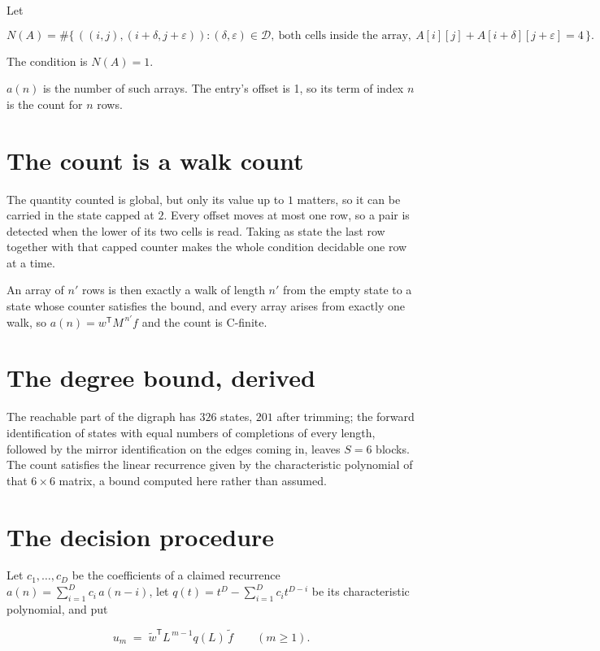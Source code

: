 \documentclass[11pt]{article}
\theoremstyle{definition}
\begin{document}
Let

\[N(A) = \#\bigl\{\,((i,j),(i{+}\delta,j{+}\varepsilon)) : (\delta,\varepsilon) \in \mathcal{D},\ \text{both cells inside the array},\ A[i][j] + A[i{+}\delta][j{+}\varepsilon] = 4\,\bigr\}.\]

The condition is $N(A) = 1$.

$a(n)$ is the number of such arrays. The entry's offset is 1, so its term of index $n$ is the count for $n$ rows.

\section{The count is a walk count}

The quantity counted is global, but only its value up to $1$ matters, so it can be carried in the state capped at $2$. Every offset moves at most one row, so a pair is detected when the lower of its two cells is read. Taking as state the last row together with that capped counter makes the whole condition decidable one row at a time.

An array of $n'$ rows is then exactly a walk of length $n'$ from the empty state to a state whose counter satisfies the bound, and every array arises from exactly one walk, so $a(n) = w^{\mathsf T}M^{\,n'}f$ and the count is C-finite.

\section{The degree bound, derived}

The reachable part of the digraph has $326$ states, $201$ after trimming; the forward identification of states with equal numbers of completions of every length, followed by the mirror identification on the edges coming in, leaves $S = 6$ blocks. The count satisfies the linear recurrence given by the characteristic polynomial of that $6\times6$ matrix, a bound computed here rather than assumed.

\section{The decision procedure}

Let $c_1,\dots,c_D$ be the coefficients of a claimed recurrence $a(n) = \sum_{i=1}^{D} c_i\,a(n-i)$, let $q(t) = t^{D} - \sum_{i=1}^{D} c_i t^{D-i}$ be its characteristic polynomial, and put

\[u_m \;=\; \tilde w^{\mathsf T} L^{\,m-1} q(L)\,\tilde f \qquad (m \ge 1).\]
\end{document}
